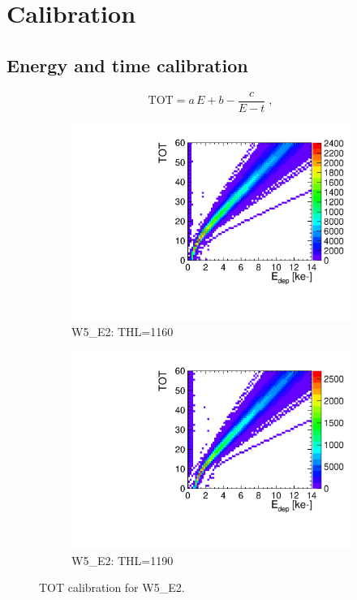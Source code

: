\section{Calibration} \label{sec:calibration}
\subsection{Energy and time
  calibration} \label{sec:TOT_TOA_calibration}
\begin{equation}
  \text{TOT} = a \, E + b - \frac{c}{E - t} \; ,
  \label{eq:TOTsurrogateFunction}
\end{equation}

\begin{figure}[htbp] \centering
  \begin{subfigure}[b]{0.45\textwidth}
    \includegraphics[width=\textwidth]{./figures/Calibration/TOTcalibration_W0005_E02_thresh1160.pdf}
    \caption{W5\_E2: THL=1160}
  \end{subfigure} \hfill
  \begin{subfigure}[b]{0.45\textwidth}
    \includegraphics[width=\textwidth]{./figures/Calibration/TOTcalibration_W0005_E02_thresh1190.pdf}
    \caption{W5\_E2: THL=1190}
  \end{subfigure}
  \caption{TOT calibration for W5\_E2.}
  \label{fig:TOTcalibW5E2}
\end{figure}


